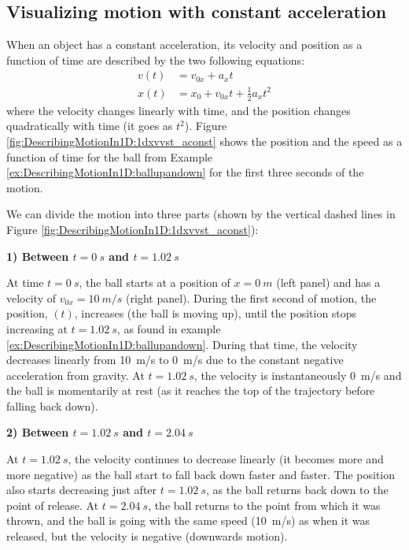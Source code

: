 \subsection{Visualizing motion with constant acceleration}

When an object has a constant acceleration, its velocity and position as a function of time are described by the two following equations:
\begin{align*}
v(t) &= v_{0x} + a_xt\\
x(t) &= x_0+v_{0x}t+ \frac{1}{2}a_xt^2
\end{align*}
where the velocity changes linearly with time, and the position changes quadratically with time (it goes as $t^2$). Figure \ref{fig:DescribingMotionIn1D:1dxvvst_aconst} shows the position and the speed as a function of time for the ball from Example \ref{ex:DescribingMotionIn1D:ballupandown} for the first three seconds of the motion.


We can divide the motion into three parts (shown by the vertical dashed lines in Figure \ref{fig:DescribingMotionIn1D:1dxvvst_aconst}):

\textbf{1) Between $t=\SI{0}{s}$ and $t=\SI{1.02}{s}$}

At time $t=\SI{0}{s}$, the ball starts at a position of $x=\SI{0}{m}$ (left panel) and has a velocity of $v_{0x}=\SI{10}{m/s}$ (right panel). During the first second of motion, the position, $(t)$, increases (the ball is moving up), until the position stops increasing at $t=\SI{1.02}{s}$, as found in example \ref{ex:DescribingMotionIn1D:ballupandown}. During that time, the velocity decreases linearly from \SI{10}{m/s} to \SI{0}{m/s} due to the constant negative acceleration from gravity. At $t=\SI{1,02}{s}$, the velocity is instantaneously \SI{0}{m/s} and the ball is momentarily at rest (as it reaches the top of the trajectory before falling back down).

\textbf{2) Between $t=\SI{1.02}{s}$ and $t=\SI{2.04}{s}$}

At $t=\SI{1.02}{s}$, the velocity continues to decrease linearly (it becomes more and more negative) as the ball start to fall back down faster and faster. The position also starts decreasing just after $t=\SI{1,02}{s}$, as the ball returns back down to the point of release. At $t=\SI{2.04}{s}$, the ball returns to the point from which it was thrown, and the ball is going with the same speed (\SI{10}{m/s}) as when it was released, but the velocity is negative (downwards motion).

